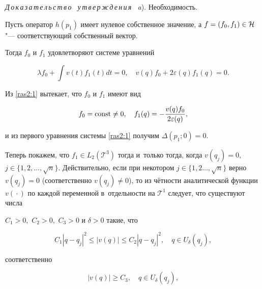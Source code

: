 \smallskip



\textit{Д\,о\,к\,а\,з\,а\,т\,е\,л\,ь\,с\,т\,в\,о \ у\,т\,в\,е\,р\,ж\,д\,е\,н\,и\,я \ a}). Необходимость.

Пусть оператор $h(p_1)$ имеет нулевое собственное значение,  а $f=(f_0, f_1)\in {\cal H}$ "--- соответствующий собственный вектор. 

Тогда $f_0$ и $f_1$ удовлетворяют системе уравнений

\begin{equation}

\lambda f_0+\int v(t)f_1(t)dt=0, \quad v(q)f_0+2\varepsilon(q)f_1(q)=0.

\label{ras2:1}

\end{equation}

Из \eqref{ras2:1} вытекает, что  $f_0$ и $f_1$ имеют вид 

\begin{equation}

f_0={\rm const} \neq 0, \quad f_1(q)=-\frac{v(q)f_0}{2 \varepsilon(q)},

\label{ras2:2}

\end{equation}

и из первого уравнения системы \eqref{ras2:1} получим $\Delta(p_1; 0)=0.$



Теперь покажем, что $f_1 \in L_2({\mathcal T}^3)$ тогда и~только тогда, когда $v(q_j) = 0,$ $j\in \{1, 2, \dots, \sqrt{n}\}.$ Действительно, если при некотором $j\in \{1, 2 \dots, {\sqrt{n}}\}$ верно $v(q_j)=0$ (соответственно $v(q_j)\neq 0$), то из чётности аналитической функции $v({}\cdot{})$ по каждой переменной в~отдельности на ${\mathcal T}^1$ следует, что существуют числа

$C_1>0,$ $C_2>0,$ $C_3>0$ и $\delta>0$ такие, что

\begin{equation}

C_1|q-q_j|^2 \leq |v(q)| \leq C_2|q-q_j|^2,\quad q\in U_\delta(q_j),

\label{ras2:3}

\end{equation}

соответственно

\begin{equation}

|v(q)|\geq C_3,\quad q\in U_\delta(q_j), \label{ras2:4}

\end{equation}

